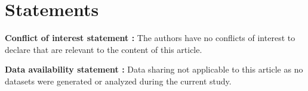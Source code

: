 \documentclass[a4paper,11pt]{amsart}
\theoremstyle{definition}
\numberwithin{equation}{section}
\theoremstyle{definition}
\begin{document}
\section*{Statements}



\textbf{Conflict of interest statement :} The authors have no conflicts of interest to declare that are relevant
to the content of this article.

\textbf{Data availability statement :} Data sharing not applicable to this article as no datasets were generated
or analyzed during the current study.


%
%
\end{document}
